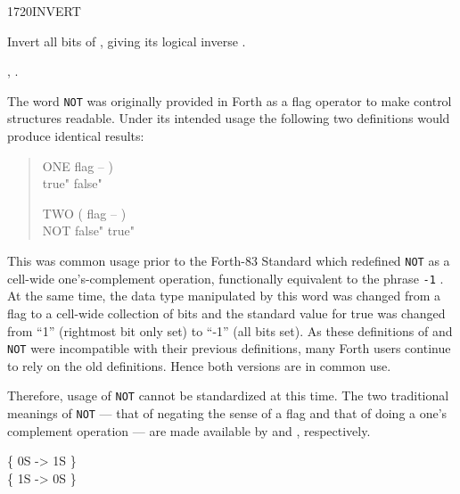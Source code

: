 \begin{worddef}{1720}{INVERT}
\item {}

	Invert all bits of , giving its logical inverse
	.

\see {},
	.

	\begin{defer}
	\rationale %
		The word \texttt{NOT} was originally provided in Forth as a
		flag operator to make control structures readable. Under its
		intended usage the following two definitions would produce
		identical results:

		\begin{quote}\ttfamily
			\word{:} ONE  flag -- ) \\
			\tab {}
					 true"
					 false"
			\word{;}

			\word{:} TWO ( flag -- ) \\
			\tab NOT 
					 false"
					 true"
			\word{;}
		\end{quote}

		This was common usage prior to the Forth-83 Standard which
		redefined \texttt{NOT} as a cell-wide one's-complement
		operation, functionally equivalent to the phrase \texttt{-1}
		. At the same time, the data type manipulated by
		this word was changed from a flag to a cell-wide collection of
		bits and the standard value for true was changed from ``1''
		(rightmost bit only set) to ``-1'' (all bits set). As these
		definitions of  and \texttt{NOT} were incompatible
		with their previous definitions, many Forth users continue to
		rely on the old definitions. Hence both versions are in common
		use.

		Therefore, usage of \texttt{NOT} cannot be standardized at
		this time. The two traditional meanings of \texttt{NOT} ---
		that of negating the sense of a flag and that of doing a one's
		complement operation --- are made available by  and
		, respectively.

	\testing
		\{ 0S  -> 1S \} \\
		\{ 1S  -> 0S \}
	\end{defer}
\end{worddef}


